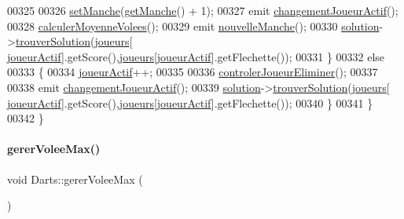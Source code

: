 \begin{DoxyCode}
00325 
00326             \hyperlink{class_darts_ab038eac80e5fc5e8abbab5682e87f8f2}{setManche}(\hyperlink{class_darts_a2ce03c887d90f3a997648981d342b50c}{getManche}() + 1);
00327             emit \hyperlink{class_darts_afeba952f29a901b4ebac86cfc7a4733f}{changementJoueurActif}();
00328             \hyperlink{class_darts_af87b6a1cd30838b99379aa4061fc43cc}{calculerMoyenneVolees}();
00329             emit \hyperlink{class_darts_ace3f99f5381399b0b86e5b8192d6fd71}{nouvelleManche}();
00330             \hyperlink{class_darts_a40733010dc6ae4ce93140804b4d191ea}{solution}->\hyperlink{class_solution_a9ab0b0fd2b557f5abda8bd1a6da641e4}{trouverSolution}(\hyperlink{class_darts_a81bc116f3ae70cea1f492f87f01901c7}{joueurs}[
      \hyperlink{class_darts_a68fb01b9aad6502e4429dfbf2a72d50b}{joueurActif}].getScore(),\hyperlink{class_darts_a81bc116f3ae70cea1f492f87f01901c7}{joueurs}[\hyperlink{class_darts_a68fb01b9aad6502e4429dfbf2a72d50b}{joueurActif}].getFlechette());
00331         \}
00332         \textcolor{keywordflow}{else}
00333         \{
00334             \hyperlink{class_darts_a68fb01b9aad6502e4429dfbf2a72d50b}{joueurActif}++;
00335 
00336             \hyperlink{class_darts_a4ddf889c9c3933e061b182aeb5680c20}{controlerJoueurEliminer}();
00337 
00338             emit \hyperlink{class_darts_afeba952f29a901b4ebac86cfc7a4733f}{changementJoueurActif}();
00339             \hyperlink{class_darts_a40733010dc6ae4ce93140804b4d191ea}{solution}->\hyperlink{class_solution_a9ab0b0fd2b557f5abda8bd1a6da641e4}{trouverSolution}(\hyperlink{class_darts_a81bc116f3ae70cea1f492f87f01901c7}{joueurs}[
      \hyperlink{class_darts_a68fb01b9aad6502e4429dfbf2a72d50b}{joueurActif}].getScore(),\hyperlink{class_darts_a81bc116f3ae70cea1f492f87f01901c7}{joueurs}[\hyperlink{class_darts_a68fb01b9aad6502e4429dfbf2a72d50b}{joueurActif}].getFlechette());
00340         \}
00341     \}
00342 \}
\end{DoxyCode}
\mbox{\label{class_darts_a1bd32af08207f7465f2973821a25dbae}} 
\paragraph{\texorpdfstring{gerer\+Volee\+Max()}{gererVoleeMax()}}
{\footnotesize\ttfamily void Darts\+::gerer\+Volee\+Max (\begin{DoxyParamCaption}{ }\end{DoxyParamCaption})\hspace{0.3cm}{\ttfamily [private]}}



